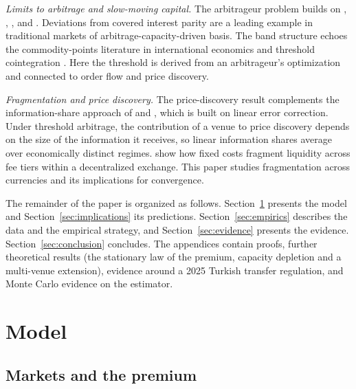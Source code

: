 \documentclass[12pt]{article}
\theoremstyle{definition}
\theoremstyle{remark}
\begin{document}
\emph{Limits to arbitrage and slow-moving capital.} The arbitrageur problem builds on \citet{shleifer1997limits}, \citet{gromb2002equilibrium}, \citet{brunnermeier2009market}, \citet{mitchell2007slow} and \citet{duffie2010presidential}. Deviations from covered interest parity \citep{du2018deviations} are a leading example in traditional markets of arbitrage-capacity-driven basis. The band structure echoes the commodity-points literature in international economics \citep{dumas1992dynamic, obstfeld1997nonlinear} and threshold cointegration \citep{balke1997threshold, hansen2002testing}. Here the threshold is derived from an arbitrageur's optimization and connected to order flow and price discovery.

\emph{Fragmentation and price discovery.} The price-discovery result complements the information-share approach of \citet{hasbrouck1995one} and \citet{gonzalo1995estimation}, which is built on linear error correction. Under threshold arbitrage, the contribution of a venue to price discovery depends on the size of the information it receives, so linear information shares average over economically distinct regimes. \citet{lehar2024fragmentation} show how fixed costs fragment liquidity across fee tiers within a decentralized exchange. This paper studies fragmentation across currencies and its implications for convergence.


The remainder of the paper is organized as follows. Section~\ref{sec:model} presents the model and Section~\ref{sec:implications} its predictions. Section~\ref{sec:empirics} describes the data and the empirical strategy, and Section~\ref{sec:evidence} presents the evidence. Section~\ref{sec:conclusion} concludes. The appendices contain proofs, further theoretical results (the stationary law of the premium, capacity depletion and a multi-venue extension), evidence around a 2025 Turkish transfer regulation, and Monte Carlo evidence on the estimator.

\section{Model}\label{sec:model}

\subsection{Markets and the premium}
\end{document}
